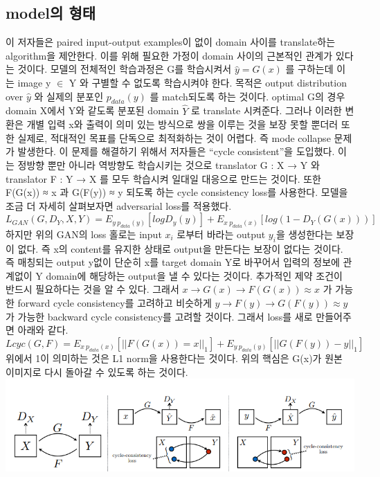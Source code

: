 \documentclass[extendedabs]{bmvc2k}
\begin{document}
 \subsection{model의 형태\cite{youtube_cycle}}
 \quad 이 저자들은 paired input-output examples이 없이 domain 사이를 translate하는 algorithm을 제안한다. 이를 위해 필요한 가정이 domain 사이의 근본적인 관계가 
 있다는 것이다. 모델의 전체적인 학습과정은 G를 학습시켜서 $\hat{y} = G(x)$ 를 구하는데 이는 image y $\in$ Y 와 구별할 수 없도록 학습시켜야 한다.
 목적은 output distribution over $\hat{y}$ 와 실제의 분포인 $p_{data}(y)$ 를 match되도록 하는 것이다. optimal G의 경우 domain X에서 Y와 같도록 분포된 domain $\hat{Y}$ 로 translate 시켜준다.
 그러나 이러한 변환은 개별 입력 x와 출력이 의미 있는 방식으로 쌍을 이루는 것을 보장 못할 뿐더러 또한 실제로, 적대적인 목표를 단독으로 최적화하는 것이 어렵다.
 즉 mode collapse 문제가 발생한다. 이 문제를 해결하기 위해서 저자들은 “cycle consistent”을 도입했다. 이는 정방향 뿐만 아니라 역방향도 학습시키는 것으로
 translator G : X → Y 와 translator F : Y → X 를 모두 학습시켜 일대일 대응으로 만드는 것이다. 또한 F(G(x)) ≈ x 과 G(F(y)) ≈ y 되도록 하는 cycle consistency loss를 사용한다.
 모델을 조금 더 자세히 살펴보자면 adversarial loss를 적용했다.
 $$ L_{GAN}(G,D_Y,X,Y) = E_{y~p_{data}(y)}[log D_y(y)] + E_{x~p_{data}(x)}[log(1-D_Y(G(x)))] $$
 하지만 위의 GAN의 loss 홀로는 input $x_{i}$ 로부터 바라는 output $y_{i}$을 생성한다는 보장이 없다. 즉 x의 content를 유지한 상태로 output을 만든다는 보장이 없다는 것이다.
 즉 매칭되는 output y없이 단순히 x를 target domain Y로 바꾸어서 입력의 정보에 관계없이 Y domain에 해당하는 output을 낼 수 있다는 것이다. 추가적인 제약 조건이 반드시 필요하다는 것을 알 수 있다.
 그래서 $ x \rightarrow G(x) \rightarrow F(G(x)) \approx x $ 가 가능한 forward cycle consistency를 고려하고 비슷하게 $ y \rightarrow F(y) \rightarrow G(F(y)) \approx y $ 
 가 가능한 backward cycle consistency를 고려할 것이다. 그래서 loss를 새로 만들어주면 아래와 같다.
 $$ L{cyc}(G,F) = E_{x ~ p_{data}(x)}[||F(G(x)) = x||_1] + E_{y~p_{data}(y)}[||G(F(y))-y||_1] $$
 위에서 1이 의미하는 것은 L1 norm을 사용한다는 것이다. 위의 핵심은 G(x)가 원본 이미지로 다시 돌아갈 수 있도록 하는 것이다. 
 \newline  \includegraphics[width=\linewidth]{images/05_cycleGAN.PNG}
\end{document}

